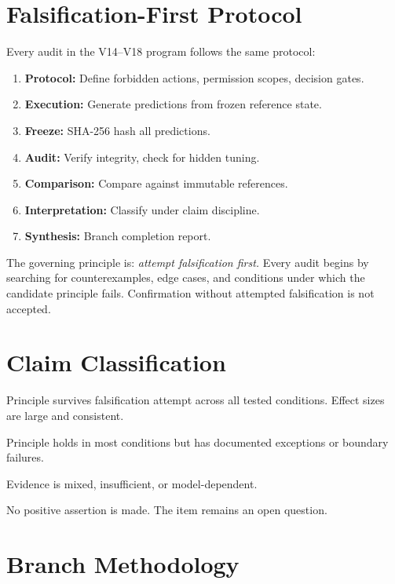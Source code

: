 \documentclass[11pt,a4paper,oneside]{report}
\newcommand{\supported}{\textcolor{supported}{SUPPORTED}}
\newcommand{\conditional}{\textcolor{conditional}{CONDITIONAL}}
\newcommand{\chypothesis}{\textcolor{hypothesis}{HYPOTHESIS}}
\begin{document}
\section{Falsification-First Protocol}

Every audit in the V14--V18 program follows the same protocol:
\begin{enumerate}[nosep]
  \item \textbf{Protocol:} Define forbidden actions, permission scopes, decision gates.
  \item \textbf{Execution:} Generate predictions from frozen reference state.
  \item \textbf{Freeze:} SHA-256 hash all predictions.
  \item \textbf{Audit:} Verify integrity, check for hidden tuning.
  \item \textbf{Comparison:} Compare against immutable references.
  \item \textbf{Interpretation:} Classify under claim discipline.
  \item \textbf{Synthesis:} Branch completion report.
\end{enumerate}

The governing principle is: \textit{attempt falsification first.} Every audit
begins by searching for counterexamples, edge cases, and conditions under which
the candidate principle fails. Confirmation without attempted falsification is
not accepted.

\section{Claim Classification}

\begin{description}[nosep, leftmargin=*]
  \item[\supported{}] Principle survives falsification attempt across all tested
    conditions. Effect sizes are large and consistent.
  \item[\conditional{}] Principle holds in most conditions but has documented
    exceptions or boundary failures.
  \item[\chypothesis{}] Evidence is mixed, insufficient, or model-dependent.
  \item[\textsc{not claimed}] No positive assertion is made. The item
    remains an open question.
\end{description}

\section{Branch Methodology}
\end{document}
